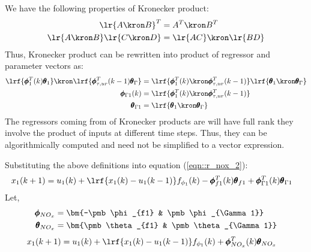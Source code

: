 We have the following properties of Kronecker product:
        \begin{align*}
                \lr{A \kron B}^T &= A^T \kron B^T \\
                \lr{A \kron B} \lr{C \kron D} &= \lr{AC} \kron \lr{BD}
        \end{align*}
Thus, Kronecker product can be rewritten into product of regressor and parameter vectors as:
\begin{align*}
        \lrf{\pmb \phi_1^T(k) \pmb \theta_1} \kron \lrf{\pmb \phi^T_{\tau, ur}(k-1) \pmb \theta_\Gamma} &=
             \lrf{ \pmb \phi_1^T(k) \kron \pmb \phi^T_{\tau, ur}(k-1) }
             \lrf{\pmb \theta_1 \kron \pmb \theta_\Gamma}\\
        \pmb \phi_{\Gamma 1} (k) &= \lrf{ \pmb \phi_1^T(k) \kron \pmb \phi^T_{\tau, ur}(k-1) } \\
        \pmb \theta_{\Gamma 1} &= \lrf{\pmb \theta_1 \kron \pmb \theta_\Gamma}
\end{align*}
The regressors coming from  of Kronecker products are will have full rank they involve the product of inputs at different time steps. Thus, they can be algorithmically computed and need not be simplified to a vector expression.

Substituting the above definitions into equation (\ref{eqn::r_nox_2}):
\begin{align}
         x_1(k+1) &=  u_1(k)  + \lrf{{x_1(k) - u_1(k-1)}} f_{\phi_1}(k) -
                     \pmb \phi_{f1}^T(k) \pmb \theta_{f1} +
                     \pmb \phi_{\Gamma 1}^T(k) \pmb \theta_{\Gamma 1}
        \label{eqn::r_nox_3}
\end{align}
Let,
\begin{align}
        \pmb \phi_{NO_x} &= \bm{-\pmb \phi_{f1} & \pmb \phi_{\Gamma 1}}\\
        \pmb \theta_{NO_x} &= \bm{\pmb \theta_{f1} & \pmb \theta_{\Gamma 1}}
\end{align}
\begin{align}
          x_1(k+1) &=  u_1(k)  + \lrf{{x_1(k) - u_1(k-1)}} f_{\phi_1}(k) +
                     \pmb \phi_{NO_x}^T (k) \pmb \theta_{NO_x}
        \label{eqn::r_nox_regression}
\end{align}




